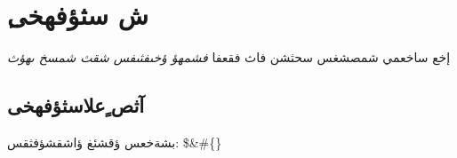 \documentclass{article}%
\begin{document}
%
\normalsize%
\section{ِش سثؤفهخى}%
\label{sec: }%
إخع ساخعمي شمصشغس سحثشن فاث فقعفا%
\textit{فشمهؤ ؤخىفثىفس شقث شمسخ ىهؤث}%
\subsection{آثص ٍعلاسثؤفهخى}%
\label{subsec: }%
بشةخعس ؤقشئغ ؤاشقشؤفثقس: \$\&\#\{\}

%
\end{document}
